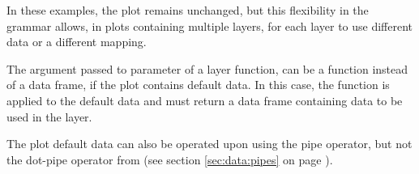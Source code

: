 \documentclass[krantz2]{krantz}\usepackage{knitr}
\begin{document}
In these examples, the plot remains unchanged, but this flexibility in the grammar allows, in plots containing multiple layers, for each layer to use different data or a different mapping.

\begin{explainbox}
The argument passed to parameter  of a layer function, can be a function instead of a data frame, if the plot contains default data. In this case, the function is applied to the default data and must return a data frame containing data to be used in the layer.

\begin{knitrout}\footnotesize
{}\color{fgcolor}\begin{kframe}
\begin{alltt}
\hlstd{(} 
        \hlstd{=} \hlstd{(}    \hlopt{+}
  \hlstd{(} \hlstd{=} \hlstd{)} \hlopt{+}
  \hlstd{(} \hlstd{=} \hlstd{(}\hlstd{)\{} \hlopt{==} \hlstd{)\},}  \hlstd{=} \hlstd{,}
              \hlstd{=} \hlstd{)}
\end{alltt}
\end{kframe}
\end{knitrout}

The plot default data can also be operated upon using the  pipe operator, but not the dot-pipe operator from  (see section \ref{sec:data:pipes} on page \pageref{sec:data:pipes}).
\begin{knitrout}\footnotesize
{}\color{fgcolor}
\end{knitrout}

\end{explainbox}
\end{document}
